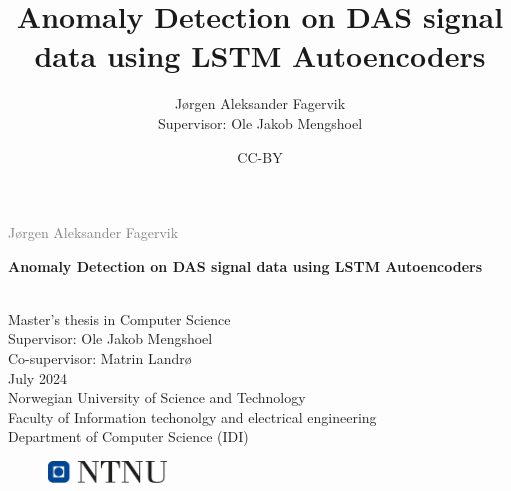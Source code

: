 \documentclass[british]{ntnuthesis}
\title{Anomaly Detection on DAS signal data using LSTM Autoencoders}
\author{Jørgen Aleksander Fagervik \\
        Supervisor: Ole Jakob Mengshoel}
\date{CC-BY \ntnuthesisdate}
\begin{document}
\begin{titlepage}
\vspace*{1.5cm}

\noindent  \textcolor{gray}{\large Jørgen Aleksander Fagervik} \\
\vspace{1cm}

\noindent \textbf{\Large Anomaly Detection on DAS signal data using LSTM Autoencoders} \\
\vspace{0.5cm}

 \\



\vspace{7cm}
\noindent Master's thesis in Computer Science \\
Supervisor: Ole Jakob Mengshoel \\
Co-supervisor: Matrin Landrø \\
July 2024 \\

\vspace{0.2cm}
\noindent Norwegian University of Science and Technology \\
Faculty of Information techonolgy and electrical engineering \\
Department of Computer Science (IDI) \\

\begin{figure}[h]
    \includegraphics[width=0.28\textwidth]{figures/ntnu_basic.png}
\end{figure}
\end{titlepage}
\restoregeometry
\myemptypage 





\tableofcontents
\listoffigures
\listoftables
\lstlistoflistings

\printglossary[type=\acronymtype] %
\printglossary                    %









\chapter*{\bibname}
\printbibliography[heading=none]

%

\appendix





\end{document}
